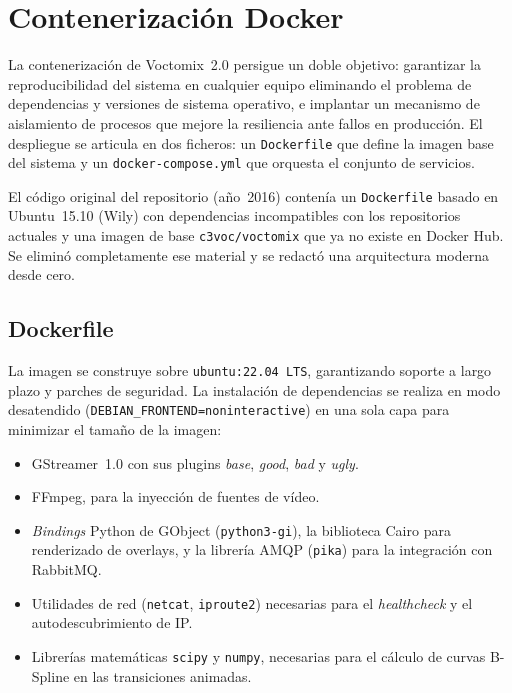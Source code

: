 \section{Contenerización Docker}
\label{sec:docker}

La contenerización de Voctomix~2.0 persigue un doble objetivo: garantizar la
reproducibilidad del sistema en cualquier equipo eliminando el problema de dependencias
y versiones de sistema operativo, e implantar un mecanismo de aislamiento de procesos
que mejore la resiliencia ante fallos en producción. El despliegue se articula en dos
ficheros: un \texttt{Dockerfile} que define la imagen base del sistema y un
\texttt{docker-compose.yml} que orquesta el conjunto de servicios.

El código original del repositorio (año~2016) contenía un \texttt{Dockerfile} basado
en Ubuntu~15.10 (Wily) con dependencias incompatibles con los repositorios actuales y
una imagen de base \texttt{c3voc/voctomix} que ya no existe en Docker Hub. Se eliminó
completamente ese material y se redactó una arquitectura moderna desde cero.

\subsection{Dockerfile}

La imagen se construye sobre \texttt{ubuntu:22.04~LTS}, garantizando soporte a largo
plazo y parches de seguridad. La instalación de dependencias se realiza en modo
desatendido (\texttt{DEBIAN\_FRONTEND=noninteractive}) en una sola capa para minimizar
el tamaño de la imagen:

\begin{itemize}
  \item GStreamer~1.0 con sus plugins \textit{base}, \textit{good}, \textit{bad} y
        \textit{ugly}.
  \item FFmpeg, para la inyección de fuentes de vídeo.
  \item \textit{Bindings} Python de GObject (\texttt{python3-gi}), la biblioteca Cairo
        para renderizado de overlays, y la librería AMQP (\texttt{pika}) para la
        integración con RabbitMQ.
  \item Utilidades de red (\texttt{netcat}, \texttt{iproute2}) necesarias para el
        \textit{healthcheck} y el autodescubrimiento de IP.
  \item Librerías matemáticas \texttt{scipy} y \texttt{numpy}, necesarias para el
        cálculo de curvas B-Spline en las transiciones animadas.
\end{itemize}

